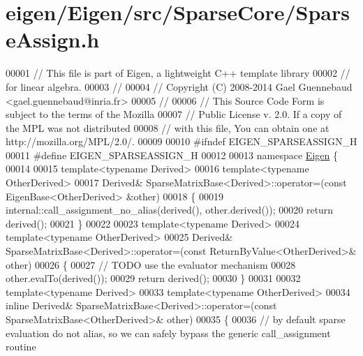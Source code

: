 \hypertarget{eigen_2_eigen_2src_2_sparse_core_2_sparse_assign_8h_source}{}\section{eigen/\+Eigen/src/\+Sparse\+Core/\+Sparse\+Assign.h}
\label{eigen_2_eigen_2src_2_sparse_core_2_sparse_assign_8h_source}

\begin{DoxyCode}
00001 \textcolor{comment}{// This file is part of Eigen, a lightweight C++ template library}
00002 \textcolor{comment}{// for linear algebra.}
00003 \textcolor{comment}{//}
00004 \textcolor{comment}{// Copyright (C) 2008-2014 Gael Guennebaud <gael.guennebaud@inria.fr>}
00005 \textcolor{comment}{//}
00006 \textcolor{comment}{// This Source Code Form is subject to the terms of the Mozilla}
00007 \textcolor{comment}{// Public License v. 2.0. If a copy of the MPL was not distributed}
00008 \textcolor{comment}{// with this file, You can obtain one at http://mozilla.org/MPL/2.0/.}
00009 
00010 \textcolor{preprocessor}{#ifndef EIGEN\_SPARSEASSIGN\_H}
00011 \textcolor{preprocessor}{#define EIGEN\_SPARSEASSIGN\_H}
00012 
00013 \textcolor{keyword}{namespace }\hyperlink{namespace_eigen}{Eigen} \{ 
00014 
00015 \textcolor{keyword}{template}<\textcolor{keyword}{typename} Derived>    
00016 \textcolor{keyword}{template}<\textcolor{keyword}{typename} OtherDerived>
00017 Derived& SparseMatrixBase<Derived>::operator=(\textcolor{keyword}{const} EigenBase<OtherDerived> &other)
00018 \{
00019   internal::call\_assignment\_no\_alias(derived(), other.derived());
00020   \textcolor{keywordflow}{return} derived();
00021 \}
00022 
00023 \textcolor{keyword}{template}<\textcolor{keyword}{typename} Derived>
00024 \textcolor{keyword}{template}<\textcolor{keyword}{typename} OtherDerived>
00025 Derived& SparseMatrixBase<Derived>::operator=(\textcolor{keyword}{const} ReturnByValue<OtherDerived>& other)
00026 \{
00027   \textcolor{comment}{// TODO use the evaluator mechanism}
00028   other.evalTo(derived());
00029   \textcolor{keywordflow}{return} derived();
00030 \}
00031 
00032 \textcolor{keyword}{template}<\textcolor{keyword}{typename} Derived>
00033 \textcolor{keyword}{template}<\textcolor{keyword}{typename} OtherDerived>
00034 \textcolor{keyword}{inline} Derived& SparseMatrixBase<Derived>::operator=(\textcolor{keyword}{const} SparseMatrixBase<OtherDerived>& other)
00035 \{
00036   \textcolor{comment}{// by default sparse evaluation do not alias, so we can safely bypass the generic call\_assignment routine}

\end{DoxyCode}
